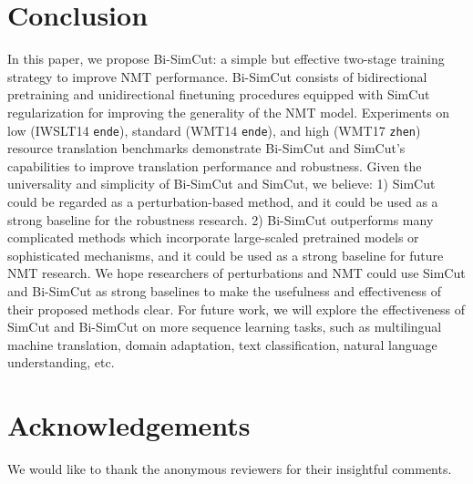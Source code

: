\documentclass[11pt]{article}
\begin{document}
\section{Conclusion}

In this paper, we propose Bi-SimCut: a simple but effective two-stage training strategy to improve NMT performance. Bi-SimCut consists of bidirectional pretraining and unidirectional finetuning procedures equipped with SimCut regularization for improving the generality of the NMT model. Experiments on low (IWSLT14 \texttt{en}\texttt{de}), standard (WMT14 \texttt{en}\texttt{de}), and high (WMT17 \texttt{zh}\texttt{en}) resource translation benchmarks demonstrate Bi-SimCut and SimCut's capabilities to improve translation performance and robustness. Given the universality and simplicity of Bi-SimCut and SimCut, we believe: 1) SimCut could be regarded as a perturbation-based method, and it could be used as a strong baseline for the robustness research. 2) Bi-SimCut outperforms many complicated methods which incorporate large-scaled pretrained models or sophisticated mechanisms, and it could be used as a strong baseline for future NMT research. We hope researchers of perturbations and NMT could use SimCut and Bi-SimCut as strong baselines to make the usefulness and effectiveness of their proposed methods clear. For future work, we will explore the effectiveness of SimCut and Bi-SimCut on more sequence learning tasks, such as multilingual machine translation, domain adaptation, text classification, natural language understanding, etc.








\section*{Acknowledgements}

We would like to thank the anonymous reviewers for their insightful comments.



\end{document}
